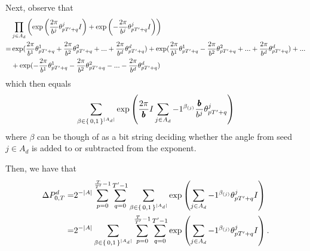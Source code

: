 \newcommand{\periodFrac}{\frac{\totalPeriod}{\rationalPeriod}}
\newcommand{\periodFracRational}{\frac{\rationalPeriodTotal}{\rationalPeriod}}

Next, observe that 
\begin{align*}
  &\prod_{j \in A_d} \left(
      \exp\left(\numbToAngle\rationalAngle{p \rationalPeriodTotal + q} I\right) +  \exp\left(-\numbToAngle\rationalAngle{p \rationalPeriodTotal + q} I\right)\right)\\
 =& 
  \exp(\numbToAngleNoJ{1}\rationalAngleJ{p \rationalPeriodTotal + q}{1} + \numbToAngleNoJ{2}\rationalAngleJ{p \rationalPeriodTotal + q}{2} + ... + \numbToAngleNoJ{d}\rationalAngleJ{p \rationalPeriodTotal + q}{d}) 
  + \exp(\numbToAngleNoJ{1}\rationalAngleJ{p \rationalPeriodTotal + q}{1} - \numbToAngleNoJ{2}\rationalAngleJ{p \rationalPeriodTotal + q}{2} + ... + \numbToAngleNoJ{d}\rationalAngleJ{p \rationalPeriodTotal + q}{d}) + ... \\
  &+ \exp(-\numbToAngleNoJ{1}\rationalAngleJ{p \rationalPeriodTotal + q}{1} - \numbToAngleNoJ{2}\rationalAngleJ{p \rationalPeriodTotal + q}{2} - ... - \numbToAngleNoJ{d}\rationalAngleJ{p \rationalPeriodTotal + q}{d})
\end{align*}
which then equals
\begin{equation}
 \sum_{\beta \in \set{0,1}^{|A_d|}} 
    \exp\left(
      	\commonToAngle I
        \sum_{j \in A_d} -1 ^ {\beta_{(j)}}
          \numbToCommon \rationalAngle{p \rationalPeriodTotal + q}
      \right)
\end{equation}
where $\beta$ can be though of as a bit string deciding whether the angle from seed
$j \in A_d$ is added to or subtracted from the exponent.

Then, we have that
\begin{align*}
 \changeTotalOneDim =&
  2^{-|A|} \sum_{p= 0}^{\frac{\totalPeriod}{\rationalPeriodTotal} - 1} \sum_{q = 0}^{\rationalPeriodTotal - 1}
 \sum_{\beta \in \set{0,1}^{|A_d|}} 
    \exp\left(
        \sum_{j \in A_d} -1 ^ {\beta_{(j)}}
        \rationalAngle{p \rationalPeriodTotal + q}I
      \right)\\
 =&
  2^{-|A|} 
 \sum_{\beta \in \set{0,1}^{|A_d|}} 
     \sum_{p= 0}^{\frac{\totalPeriod}{\rationalPeriodTotal} - 1} \sum_{q = 0}^{\rationalPeriodTotal - 1}
    \exp\left(
        \sum_{j \in A_d} -1 ^ {\beta_{(j)}}
        \rationalAngle{p \rationalPeriodTotal + q}I
      \right).
\end{align*}

